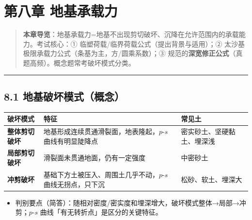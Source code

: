 \documentclass[
]{article}
\author{}
\date{}
\newcounter{none} %
\providecommand{\tightlist}{%
  \setlength{\itemsep}{0pt}\setlength{\parskip}{0pt}}
\begin{document}
\section{第八章
地基承载力}\label{ux7b2cux516bux7ae0-ux5730ux57faux627fux8f7dux529b}

\begin{quote}
\textbf{本章导览}：地基承载力=地基不出现剪切破坏、沉降在允许范围内的承载能力。考试核心：①
临塑荷载/临界荷载公式（提出背景与适用）；②
太沙基极限承载力公式（条基为主，方/圆乘系数）；③
规范的\textbf{深宽修正公式}（真题高频）。概念题常考破坏模式分类。
\end{quote}

\begin{center}\rule{0.5\linewidth}{0.5pt}\end{center}

\subsection{8.1
地基破坏模式（概念）}\label{ux5730ux57faux7834ux574fux6a21ux5f0fux6982ux5ff5}

{\def\LTcaptype{none} %
\begin{longtable}[]{@{}
  >{\raggedright\arraybackslash}p{}
  >{\raggedright\arraybackslash}p{}
  >{\raggedright\arraybackslash}p{}@{}}
\toprule\noalign{}
\begin{minipage}[b]{\linewidth}\raggedright
破坏模式
\end{minipage} & \begin{minipage}[b]{\linewidth}\raggedright
特征
\end{minipage} & \begin{minipage}[b]{\linewidth}\raggedright
常见土
\end{minipage} \\
\midrule\noalign{}
\endhead
\bottomrule\noalign{}
\endlastfoot
\textbf{整体剪切破坏} & 地基形成连续贯通滑裂面，地表隆起，\(p\text{-}s\)
曲线有明显陡降点 & 密实砂土、坚硬黏土、埋深浅 \\
\textbf{局部剪切破坏} & 滑裂面未贯通地面，仍有一定强度 & 中密砂土 \\
\textbf{冲剪破坏} & 基础下方土被压入、周围土几乎不动，\(p\text{-}s\)
曲线无拐点，只下沉 & 松砂、软土、埋深大 \\
\end{longtable}
}

\begin{itemize}
\tightlist
\item
  判别要点（简答）：随相对密度/密实度和埋深增大，破坏模式整体→局部→冲剪；\(p\)-\(s\)
  曲线「有无转折点」是区分的关键特征。
\end{itemize}
\end{document}
